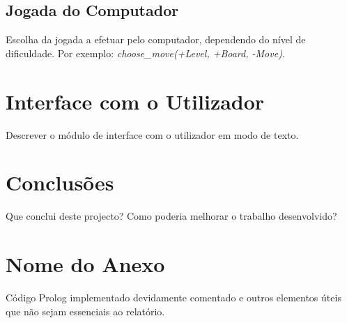 \documentclass[a4paper]{article}
\begin{document}
\subsection{Jogada do Computador} Escolha da jogada a efetuar pelo computador, dependendo do nível de dificuldade. Por exemplo: \textit{choose\_move(+Level, +Board, -Move)}.


\section{Interface com o Utilizador}

Descrever o módulo de interface com o utilizador em modo de texto.


\section{Conclusões}
Que conclui deste projecto? Como poderia melhorar o trabalho desenvolvido?


\clearpage
{}
\renewcommand\refname{Bibliografia}



\newpage
\appendix
\section{Nome do Anexo}
Código Prolog implementado devidamente comentado e outros elementos úteis que não sejam essenciais ao relatório.
\end{document}
